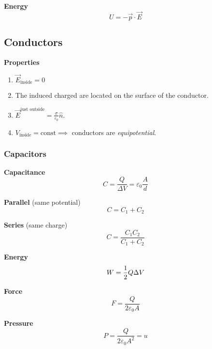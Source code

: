 \documentclass[10pt]{extarticle}
\numberwithin{equation}{section}
\begin{document}
\begin{multicols}{2}
    \textbf{Energy}
    \begin{equation}
        U = - \vec p \cdot \vec E
    \end{equation}

    \subsection{Conductors}

    \textbf{Properties}
    \begin{enumerate}
        \item $\vec E_\text{inside} = 0$
        \item The induced charged are located on the surface of the conductor.
        \item $\vec E^\text{just outside} = \frac{\sigma}{\varepsilon_0} \hat n$.
        \item $V_\text{inside} = \text{const} \implies$ conductors are \emph{equipotential}.
    \end{enumerate}

    \subsubsection{Capacitors}

    \textbf{Capacitance}
    \begin{equation}
        C = \frac{Q }{\Delta V} = \varepsilon_0 \frac{A}{d}
    \end{equation}

    \textbf{Parallel} (same potential)
    \begin{equation}
        C = C_1 + C_2
    \end{equation}

    \textbf{Series} (same charge)
    \begin{equation}
        C = \frac{C_1 C_2}{C_1 + C_2}
    \end{equation}

    \textbf{Energy}
    \begin{equation}
        W = \frac{1}{2} Q \Delta V
    \end{equation}

    \textbf{Force}
    \begin{equation}
        F = \frac{Q}{2 \varepsilon_0 A}
    \end{equation}

    \textbf{Pressure}
    \begin{equation}
        P = \frac{Q}{2 \varepsilon_0 A^2} = u
    \end{equation}


\end{multicols}
\end{document}
